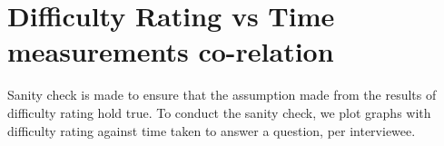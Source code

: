 \label{appedixa}

\section{Difficulty Rating vs Time measurements co-relation}
\label{sanityCheck}
Sanity check is made to ensure that the assumption made from the results of difficulty rating hold true. To conduct the sanity check, we plot graphs with difficulty rating against time taken to answer a question, per interviewee.

